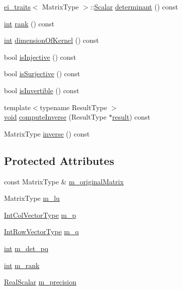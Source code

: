 \begin{DoxyCompactItemize}
\item 
\hyperlink{structei__traits}{ei\-\_\-traits}$<$ Matrix\-Type $>$\-::\hyperlink{class_l_u_a2652e625ba82c85391e6cf4c3d821350}{Scalar} \hyperlink{class_l_u_ad6c5982642808e1269e858be11573c9a}{determinant} () const 
\item 
\hyperlink{ioapi_8h_a787fa3cf048117ba7123753c1e74fcd6}{int} \hyperlink{class_l_u_a23c04ccdfd9182b3b0b41dae12beb28a}{rank} () const 
\item 
\hyperlink{ioapi_8h_a787fa3cf048117ba7123753c1e74fcd6}{int} \hyperlink{class_l_u_a29bdadb2f92c28ddb4a2301bd766e327}{dimension\-Of\-Kernel} () const 
\item 
bool \hyperlink{class_l_u_ad6490dec31472836f633739a7789e71f}{is\-Injective} () const 
\item 
bool \hyperlink{class_l_u_a8519c32afdf82258b93bd7a3274b59eb}{is\-Surjective} () const 
\item 
bool \hyperlink{class_l_u_a7b4fe58c504fb3c28d29f198a10bf5e0}{is\-Invertible} () const 
\item 
{\footnotesize template$<$typename Result\-Type $>$ }\\\hyperlink{group___u_a_v_objects_plugin_ga444cf2ff3f0ecbe028adce838d373f5c}{void} \hyperlink{class_l_u_a3db080336b22760ca951e8732fd67d16}{compute\-Inverse} (Result\-Type $\ast$\hyperlink{qxtslotjob_8h_aab161efab0511ea9612b64c40e9852ca}{result}) const 
\item 
Matrix\-Type \hyperlink{class_l_u_aa6216497ac4d2d2ed495432793bb2ae7}{inverse} () const 
\end{DoxyCompactItemize}
\subsection*{Protected Attributes}
\begin{DoxyCompactItemize}
\item 
const Matrix\-Type \& \hyperlink{class_l_u_ac0ddae608326613044fd370e23fc5798}{m\-\_\-original\-Matrix}
\item 
Matrix\-Type \hyperlink{class_l_u_a6002bcdbe1c561d3e9e6ae3289db72cb}{m\-\_\-lu}
\item 
\hyperlink{class_l_u_a830b9928b7aed0f3b0147dd0aa6b8f2e}{Int\-Col\-Vector\-Type} \hyperlink{class_l_u_a7666f778da10e87f96aa8a3c19b7a112}{m\-\_\-p}
\item 
\hyperlink{class_l_u_a8b1b7e093c9203820f5e557b9e0c4edf}{Int\-Row\-Vector\-Type} \hyperlink{class_l_u_a3613b350d88bbf92f783cf0db45366f9}{m\-\_\-q}
\item 
\hyperlink{ioapi_8h_a787fa3cf048117ba7123753c1e74fcd6}{int} \hyperlink{class_l_u_a660047068751fe2899eab257abf2689d}{m\-\_\-det\-\_\-pq}
\item 
\hyperlink{ioapi_8h_a787fa3cf048117ba7123753c1e74fcd6}{int} \hyperlink{class_l_u_a6fce66346164396520654fc54d25c54a}{m\-\_\-rank}
\item 
\hyperlink{class_l_u_a2b211092ffd28cd189ea254c951cf8d5}{Real\-Scalar} \hyperlink{class_l_u_a2166ed8c8e8764d0ca86dca4518eadba}{m\-\_\-precision}
\end{DoxyCompactItemize}



